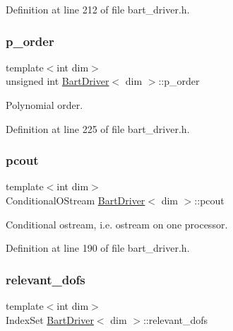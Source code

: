 Definition at line 212 of file bart\+\_\+driver.\+h.

\mbox{\label{class_bart_driver_ae6d782d30c28d741bb0df46251087809}} 
\subsubsection{\texorpdfstring{p\+\_\+order}{p\_order}}
{\footnotesize\ttfamily template$<$int dim$>$ \\
unsigned int \hyperlink{class_bart_driver}{Bart\+Driver}$<$ dim $>$\+::p\+\_\+order\hspace{0.3cm}{\ttfamily [private]}}



Polynomial order. 



Definition at line 225 of file bart\+\_\+driver.\+h.

\mbox{\label{class_bart_driver_ad7bd8e33b7a6e67aa3d31527e40d18ea}} 
\subsubsection{\texorpdfstring{pcout}{pcout}}
{\footnotesize\ttfamily template$<$int dim$>$ \\
Conditional\+O\+Stream \hyperlink{class_bart_driver}{Bart\+Driver}$<$ dim $>$\+::pcout\hspace{0.3cm}{\ttfamily [private]}}



Conditional ostream, i.\+e. ostream on one processor. 



Definition at line 190 of file bart\+\_\+driver.\+h.

\mbox{\label{class_bart_driver_aabb9851e7b41f4a4b9395d79e4653ec7}} 
\subsubsection{\texorpdfstring{relevant\+\_\+dofs}{relevant\_dofs}}
{\footnotesize\ttfamily template$<$int dim$>$ \\
Index\+Set \hyperlink{class_bart_driver}{Bart\+Driver}$<$ dim $>$\+::relevant\+\_\+dofs\hspace{0.3cm}{\ttfamily [private]}}



